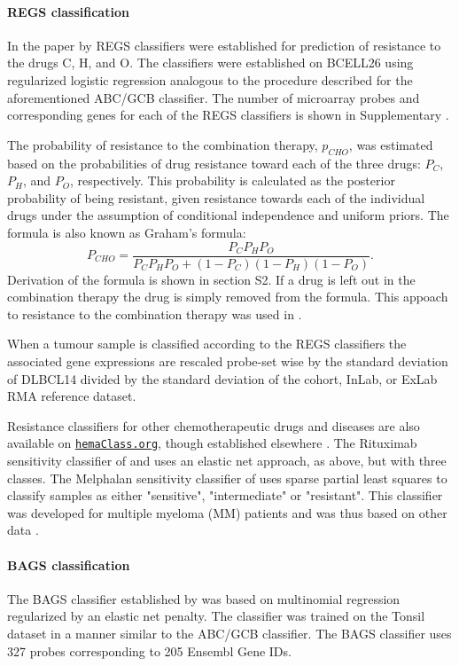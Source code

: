 \documentclass[10pt,letterpaper]{article}
\newcommand{\hemaClass}{\href{http://hemaClass.org}{\texttt{hemaClass.org}}}
\begin{document}
\paragraph{REGS classification}
\label{sec:regsmethods}
In the paper by \cite{Falgreen2015} REGS classifiers were established for prediction of resistance to the drugs C, H, and O.
The classifiers were established on BCELL26 using regularized logistic regression analogous to the procedure described for the aforementioned ABC/GCB classifier. The number of microarray probes and corresponding genes for each of the REGS classifiers is shown in Supplementary .

The probability of resistance to the combination therapy, $p_{CHO}$, was estimated based on the probabilities of drug resistance toward each of the three drugs: $P_C$, $P_H$, and $P_O$, respectively.
This probability is calculated as the posterior probability of being resistant, given resistance towards each of the individual drugs under the assumption of conditional independence and uniform priors.
The formula is also known as Graham's formula:
\begin{equation*}
P_{CHO} = \frac{P_C P_H P_O}{P_C P_H P_O + (1 - P_C)(1 - P_H)(1 - P_O)}.
\end{equation*}
Derivation of the formula is shown in  section S2.
If a drug is left out in the combination therapy the drug is simply removed from the formula.
This appoach to resistance to the combination therapy was used in \cite{Falgreen2015}.

When a tumour sample is classified according to the REGS classifiers the associated gene expressions are rescaled probe-set wise by the standard deviation of DLBCL14 divided by the standard deviation of the cohort, InLab, or ExLab RMA reference dataset.

Resistance classifiers for other chemotherapeutic drugs and diseases are also available on \hemaClass{}, though established elsewhere \cite{Boegsted2011,Bogsted2013,Laursen2014}.
The Rituximab sensitivity classifier of \cite{Laursen2014} and \cite{Laursen2015} uses an elastic net approach, as above, but with three classes.
The Melphalan sensitivity classifier of \cite{Boegsted2011} uses sparse partial least squares to classify samples as either "sensitive", "intermediate" or "resistant". This classifier was developed for multiple myeloma (MM) patients and was thus based on other data \cite{Boegsted2011}.


\paragraph{BAGS classification}
The BAGS classifier established by \cite{DybkaerBoegsted2015} was based on multinomial regression regularized by an elastic net penalty.
The classifier was trained on the Tonsil dataset in a manner similar to the ABC/GCB classifier. The BAGS classifier uses 327 probes corresponding to 205 Ensembl Gene IDs.
\end{document}
